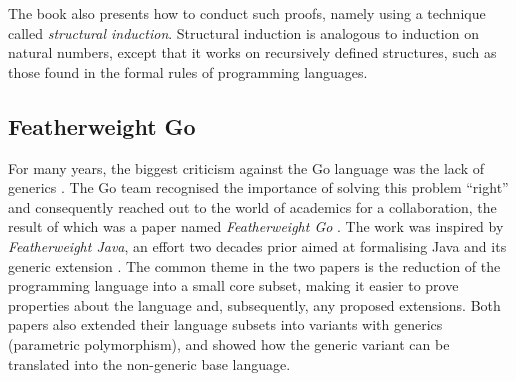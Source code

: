 The book also presents how to conduct such proofs, namely using a technique
called \emph{structural induction}. Structural induction is analogous to
induction on natural numbers, except that it works on recursively defined
structures, such as those found in the formal rules of programming languages.

\subsection{Featherweight Go}

For many years, the biggest criticism against the Go language was the lack of
generics \autocites{survey2021}{survey2020}{survey2019}. The Go team recognised
the importance of solving this problem ``right'' and consequently reached out to
the world of academics for a collaboration, the result of which was a paper
named \emph{Featherweight Go} \autocite{fg}. The work was inspired by
\emph{Featherweight Java}, an effort two decades prior aimed at formalising Java
and its generic extension \autocite{fj}.
The common theme in the two papers is the reduction of the programming language
into a small core subset, making it easier to prove properties about the
language and, subsequently, any proposed extensions.
Both papers also extended their language subsets into variants with generics
(parametric polymorphism), and showed how the generic variant can be translated
into the non-generic base language.

